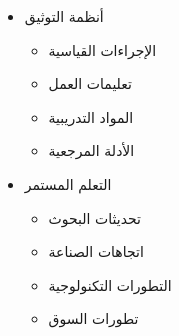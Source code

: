 \begin{itemize}
\begin{itemize}
        \item أنظمة التوثيق
        \begin{itemize}
            \item الإجراءات القياسية
            \item تعليمات العمل
            \item المواد التدريبية
            \item الأدلة المرجعية
        \end{itemize}
        
        \item التعلم المستمر
        \begin{itemize}
            \item تحديثات البحوث
            \item اتجاهات الصناعة
            \item التطورات التكنولوجية
            \item تطورات السوق
        \end{itemize}
    \end{itemize}
\end{itemize}

